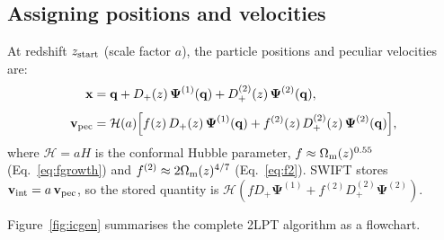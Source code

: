 \documentclass[12pt]{article}
\newcommand{\bq}{\mathbf{q}}
\newcommand{\bx}{\mathbf{x}}
\newcommand{\bPsi}{\boldsymbol{\Psi}}
\newcommand{\bv}{\mathbf{v}}
\newcommand{\Dp}{D_+}
\newcommand{\Dpp}{D_+^{(2)}}
\newcommand{\Omm}{\Omega_{\rm m}}
\newcommand{\calH}{\mathcal{H}}
\begin{document}
\subsection{Assigning positions and velocities}

At redshift $z_{\rm start}$ (scale factor $a$), the particle
positions and peculiar velocities are:
%
\begin{align}
  \bx &= \bq
       + \Dp(z)\,\bPsi^{(1)}(\bq)
       + \Dpp(z)\,\bPsi^{(2)}(\bq),
  \label{eq:x_ic}\\[4pt]
  \bv_{\rm pec} &= \calH(a)\Bigl[
       f(z)\,\Dp(z)\,\bPsi^{(1)}(\bq)
     + f^{(2)}(z)\,\Dpp(z)\,\bPsi^{(2)}(\bq)\Bigr],
  \label{eq:v_ic}
\end{align}
%
where $\calH = aH$ is the conformal Hubble parameter,
$f \approx \Omm(z)^{0.55}$ (Eq.~\ref{eq:fgrowth}) and
$f^{(2)} \approx 2\Omm(z)^{4/7}$ (Eq.~\ref{eq:f2}).
SWIFT stores $\bv_{\rm int} = a\,\bv_{\rm pec}$, so the stored
quantity is $\calH(f\Dp\bPsi^{(1)} + f^{(2)}\Dpp\bPsi^{(2)})$.

Figure~\ref{fig:icgen} summarises the complete 2LPT algorithm as
a flowchart.
\end{document}
